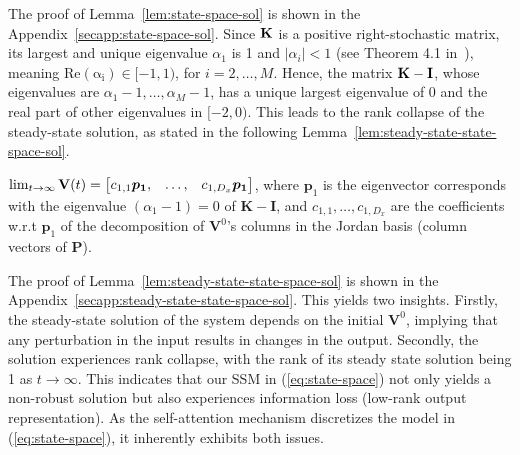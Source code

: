 The proof of Lemma~\ref{lem:state-space-sol} is shown in the Appendix~\ref{secapp:state-space-sol}. Since ${\mathbf K}$ is a positive right-stochastic matrix, its largest and unique eigenvalue $\alpha_1$ is 1 and $|\alpha_i| < 1$ (see Theorem 4.1 in~\cite{strohmer2020mathdl}), meaning $\mathrm{Re(\alpha_i)} \in [-1, 1)$, for $i = 2, \dots, M$. Hence, the matrix ${\mathbf K} - {\mathbf I}$, whose eigenvalues are $\alpha_1 - 1, \dots, \alpha_M - 1$, has a unique largest eigenvalue of 0 and the real part of other eigenvalues in $[-2, 0)$. This leads to the rank collapse of the steady-state solution, as stated in the following Lemma~\ref{lem:steady-state-state-space-sol}.
\begin{lemma}
\label{lem:steady-state-state-space-sol}
     $\lim_{t \to \infty}{\mathbf V}(t) = \begin{bmatrix} \displaystyle c_{1,1}\bm{p_1}, & \dots,&c_{1, D_x}\bm{p_1} \end{bmatrix}$,
    where $\bm{p}_1$ is the eigenvector corresponds with the eigenvalue $(\alpha_1 - 1) = 0$ of $\bm{K} - \bm{I}$, and $c_{1,1}, \dots, c_{1,D_x}$ are the coefficients w.r.t $\bm{p}_1$ of the decomposition of $\bm{V}^0$'s columns in the Jordan basis (column vectors of $\bm{P}$).
\end{lemma}

\vspace{-2mm}
The proof of Lemma~\ref{lem:steady-state-state-space-sol} is shown in the Appendix~\ref{secapp:steady-state-state-space-sol}.
This yields two insights. Firstly, the steady-state solution of the system depends on the initial $\bm{V}^0$, implying that any perturbation in the input results in changes in the output. 
Secondly, the solution experiences rank collapse, with the rank of its steady state solution being 1 as $t \to \infty$. This indicates that our SSM in (\ref{eq:state-space}) not only yields a non-robust solution but also experiences information loss (low-rank output representation). As the self-attention mechanism discretizes the model in (\ref{eq:state-space}), it inherently exhibits both issues.
\vspace{-3mm}
